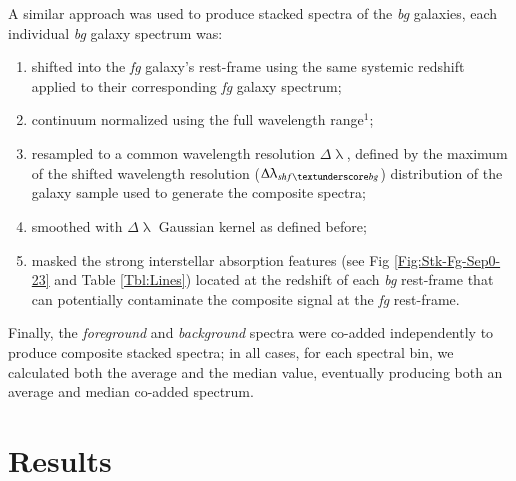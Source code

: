 \documentclass[longauth]{aa}
\begin{document}
A similar approach was used to produce stacked spectra of the \textit
{bg} galaxies, each individual \textit{bg} galaxy spectrum was:

\begin{enumerate}
    \item shifted into the \textit {fg} galaxy's rest-frame using the same
     systemic redshift applied to their corresponding \textit{fg} galaxy
     spectrum;
    \item continuum normalized using the full wavelength range$^{1}$;
    \item resampled to a common wavelength resolution $\Delta\uplambda$,
     defined by the maximum of the shifted wavelength resolution
     ($\Delta\uplambda_{shf\textunderscore bg}$) distribution of the galaxy
     sample used to generate the composite spectra;
    \item smoothed with $\Delta\uplambda$ Gaussian kernel as defined before;
    \item masked the strong interstellar absorption features (see Fig 
    \ref{Fig:Stk-Fg-Sep0-23} and Table \ref{Tbl:Lines}) located at the
     redshift of each \textit{bg} rest-frame that can potentially
     contaminate the composite signal at the \textit{fg} rest-frame. 
\end{enumerate}

Finally, the \textit{foreground} and \textit{background} spectra were co-added
independently to produce composite stacked spectra; in all cases, for each
spectral bin, we calculated both the average and the median value, eventually
producing both an average and median co-added spectrum.


\section{Results}\label{sec:Res}
\end{document}
